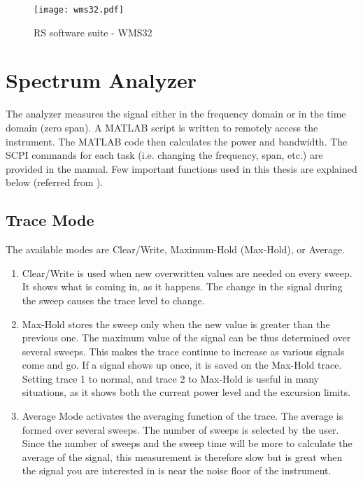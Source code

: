 \begin{figure}[H]
\centering
\texttt{[image: wms32.pdf]}
\caption{\acs{RS} software suite - WMS32}
\label{fig:softwaresuite}
\end{figure}

\section{Spectrum Analyzer}
The analyzer measures the signal either in the frequency domain or in the time domain (zero span). A MATLAB\textregistered{} script is written to remotely access the instrument. The MATLAB\textregistered{} code then calculates the power and bandwidth. The \acf{SCPI} commands for each task (i.e. changing the frequency, span, etc.) are provided in the manual. Few important functions used in this thesis are explained below (referred from \cite{funsspec}).

\subsection{Trace Mode}
The available modes are Clear/Write, Maximum-Hold (Max-Hold), or Average.
\begin{enumerate}
  \item Clear/Write is used when new overwritten values are needed on every sweep. It shows what is coming in, as it happens. The change in the signal during the sweep causes the trace level to change. 
  \item Max-Hold stores the sweep only when the new value is greater than the previous one. The maximum value of the signal can be thus determined over several sweeps. This makes the trace continue to increase as various signals come and go. If a signal shows up once, it is saved on the Max-Hold trace. Setting trace 1 to normal, and trace 2 to Max-Hold is useful in many situations, as it shows both the current power level and the excursion limits.  
  \item Average Mode activates the averaging function of the trace. The average is formed over several sweeps. The number of sweeps is selected by the user. Since the number of sweeps and the sweep time will be more to calculate the average of the signal, this measurement is therefore slow but is great when the signal you are interested in is near the noise floor of the instrument.  
  \end{enumerate}


